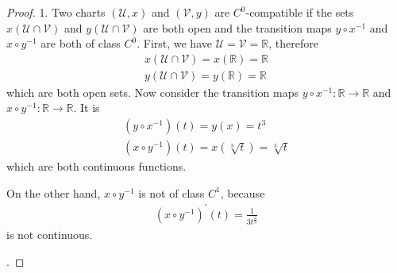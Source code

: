 \documentclass{book}
\theoremstyle{custom_definition}
\theoremstyle{custom_theorem}
\begin{document}
    \begin{proof}
        1. \space Two charts \((\mathcal{U}, x)\) and \((\mathcal{V}, y)\) are \(C^0\)-compatible if the sets \(x(\mathcal{U} \cap \mathcal{V})\) and \(y(\mathcal{U} \cap \mathcal{V})\) are both open and the transition maps \(y \circ x^{-1}\) and \(x \circ y^{-1}\) are both of class \(C^0\). First, we have \(\mathcal{U} = \mathcal{V} = \mathbb{R}\), therefore
        \begin{align}
            x(\mathcal{U} \cap \mathcal{V}) = x(\mathbb{R}) = \mathbb{R} \\
            y(\mathcal{U} \cap \mathcal{V}) = y(\mathbb{R}) = \mathbb{R}
        \end{align}
        which are both open sets. Now consider the transition maps \(y \circ x^{-1}: \mathbb{R} \longrightarrow \mathbb{R}\) and \(x \circ y^{-1}: \mathbb{R} \longrightarrow \mathbb{R}\). It is
        \begin{align}
            \left( y \circ x^{-1} \right) (t) = y(x) = t^3 \\
            \left( x \circ y^{-1} \right) (t) = x(\sqrt[3]{t}) = \sqrt[3]{t}
        \end{align}
        which are both continuous functions.

        On the other hand, \(x \circ y^{-1}\) is not of class \(C^1\), because
        \begin{align}
            (x \circ y^{-1})^\prime (t) = \frac{1}{3t^{\frac{2}{3}}}
        \end{align}
        is not continuous.

        \vspace{1cm}
        . \space
    \end{proof}
\end{document}
